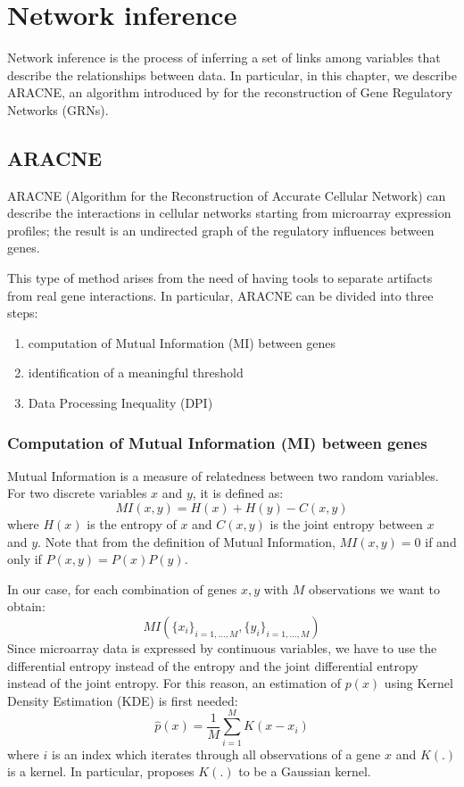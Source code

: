 \chapter{Network inference} \label{networks}

Network inference is the process of inferring a set of links among variables
that describe the relationships between data.
In particular, in this chapter, we describe ARACNE, an algorithm introduced by \cite{DBLP:journals/bmcbi/MargolinNBWSFC06}
for the reconstruction of Gene Regulatory Networks (GRNs).

\section{ARACNE} \label{aracne}
ARACNE (Algorithm for the Reconstruction of Accurate Cellular Network)
can describe the interactions in cellular networks
starting from microarray expression profiles;
the result is an undirected graph of the regulatory influences between genes.

This type of method arises from the need of having tools to separate artifacts
from real gene interactions.
In particular, ARACNE can be divided into three steps:
\begin{enumerate}
    \item computation of Mutual Information (MI) between genes
    \item identification of a meaningful threshold
    \item Data Processing Inequality (DPI)
\end{enumerate}

\subsection{Computation of Mutual Information (MI) between genes} \label{MI}
Mutual Information is a measure of relatedness between two random variables.
For two discrete variables $x$ and $y$, it is defined as:
\[ \mathit{MI}(x, y) = H(x) + H(y) - C(x, y) \]
where $H(x)$ is the entropy of $x$ and $C(x, y)$ is the joint entropy between $x$ and $y$.
Note that from the definition of Mutual Information,
$\mathit{MI}(x, y) = 0$
if and only if $P(x, y) = P(x) P(y)$.

In our case, for each combination of genes $x, y$ with $M$ observations we want to obtain:
\[ \mathit{MI}(\{ x_i \}_{i=1,\dots,M}, \{ y_i \}_{i=1,\dots,M}) \]
Since microarray data is expressed by continuous variables,
we have to use the differential entropy instead of the entropy
and the joint differential entropy instead of the joint entropy.
For this reason, an estimation of $p(x)$
using Kernel Density Estimation (KDE) is first needed:
\[ \hat{p}(x) = \frac{1}{M} \sum_{i=1}^{M} K(x - x_i) \]
where $i$ is an index which iterates through all observations of a gene $x$
and $K(.)$ is a kernel.
In particular, \cite{DBLP:journals/bmcbi/MargolinNBWSFC06} proposes
$K(.)$ to be a Gaussian kernel.

